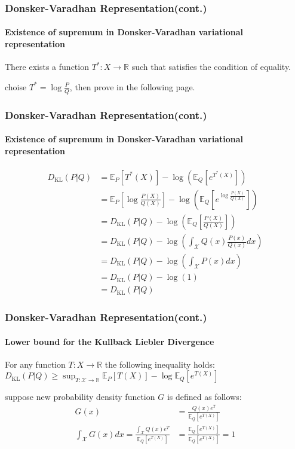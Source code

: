 \documentclass[aspectratio=169]{beamer}
\begin{document}
	\begin{frame}
		\frametitle{Donsker-Varadhan Representation(cont.)}
		\framesubtitle{Existence of supremum in Donsker-Varadhan variational representation}
		\begin{lemma}
			There exists a function $T^*: X \rightarrow \mathbb{R}$ such that satisfies the condition of equality.
		\end{lemma}
		choise $T^* = \log\frac{P}{Q}$, then prove in the following page.
	\end{frame}


	\begin{frame}
		\frametitle{Donsker-Varadhan Representation(cont.)}
		\framesubtitle{Existence of supremum in Donsker-Varadhan variational representation}
		\begin{align}
			D_{\text{KL}}(P|Q) &= \mathbb{E}_P[T^*(X)] - \log(\mathbb{E}_Q[e^{T^*(X)}])\\			
			&= \mathbb{E}_P [\log \frac{P(X)}{Q(X)}]-\log(\mathbb{E}_Q[e^{\log\frac{P(X)}{Q(X)}}])\\
			&= D_{\text{KL}}(P|Q) - \log(\mathbb{E}_Q[\frac{P(X)}{Q(X)}])\\
			&= D_{\text{KL}}(P|Q) - \log(\int_{\mathcal{X}} Q(x)\frac{P(x)}{Q(x)}dx)\\
			&= D_{\text{KL}}(P|Q) - \log(\int_{\mathcal{X}} P(x)dx)\\
			&= D_{\text{KL}}(P|Q) - \log(1)\\
			&= D_{\text{KL}}(P|Q)
		\end{align}
	\end{frame}

	\begin{frame}
		\frametitle{Donsker-Varadhan Representation(cont.)}
		\framesubtitle{Lower bound for the Kullback Liebler Divergence}
		\begin{lemma}\label{lemma:lower_bound}
			For any function $T:X \rightarrow \mathbb{R}$ the following inequality holds:
			$D_{\text{KL}}(P | Q) \geq \sup_{T: \mathcal{X} \rightarrow \mathbb{R}} {\mathbb{E}_P[T(X)] - \log \mathbb{E}_Q[e^{T(X)}]}$
		\end{lemma}
		suppose new probability density function $G$ is defined as follows:
		\begin{align}
			G(x) &=\frac{Q(x)e^T}{\mathbb{E}_Q[e^{T(X)}]}\\
			\int_{\mathcal{X}} G(x)dx = \frac{\int_{\mathcal{X}} Q(x)e^T}{\mathbb{E}_Q[e^{T(X)}]} 
			&=\frac{\mathbb{E}_Q[e^{T(X)}]}{\mathbb{E}_Q[e^{T(X)}]} = 1 
		\end{align}
	\end{frame}
\end{document}
